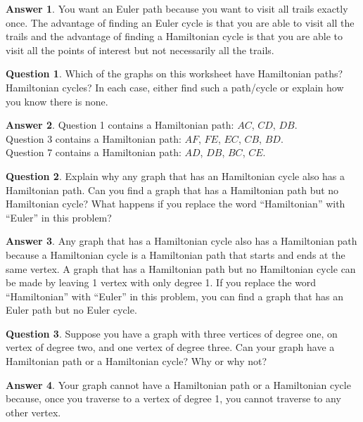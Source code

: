 \documentclass[article, 12pt]{article}
\theoremstyle{definition}
\newtheorem{question}{Question}
\newtheorem{answer}{Answer}
\begin{document}
    \begin{answer}
        You want an Euler path because you want to visit all trails exactly once. The advantage of finding an Euler cycle is that you are able to visit all the trails and the advantage of finding a Hamiltonian cycle is that you are able to visit all the points of interest but not necessarily all the trails.
    \end{answer}
    \begin{question}
        Which of the graphs on this worksheet have Hamiltonian paths? Hamiltonian cycles? In each case, either find such a path/cycle or explain how you know there is none.
    \end{question}
    \begin{answer}
        Question 1 contains a Hamiltonian path: $AC$, $CD$, $DB$.
        \\[12pt]
        Question 3 contains a Hamiltonian path: $AF$, $FE$, $EC$, $CB$, $BD$.
        \\[12pt]
        Question 7 contains a Hamiltonian path: $AD$, $DB$, $BC$, $CE$.
    \end{answer}
    \begin{question}
        Explain why any graph that has an Hamiltonian cycle also has a Hamiltonian path. Can you find a graph that has a Hamiltonian path but no Hamiltonian cycle? What happens if you replace the word “Hamiltonian” with “Euler” in this problem?
    \end{question}
    \begin{answer}
        Any graph that has a Hamiltonian cycle also has a Hamiltonian path because a Hamiltonian cycle is a Hamiltonian path that starts and ends at the same vertex. A graph that has a Hamiltonian path but no Hamiltonian cycle can be made by leaving 1 vertex with only degree 1. If you replace the word “Hamiltonian” with “Euler” in this problem, you can find a graph that has an Euler path but no Euler cycle. 
    \end{answer}
    \begin{question}
        Suppose you have a graph with three vertices of degree one, on vertex of degree two, and one vertex of degree three. Can your graph have a Hamiltonian path or a Hamiltonian cycle? Why or why not?
    \end{question}
    \begin{answer}
        Your graph cannot have a Hamiltonian path or a Hamiltonian cycle because, once you traverse to a vertex of degree 1, you cannot traverse to any other vertex. 
    \end{answer}
\end{document}

